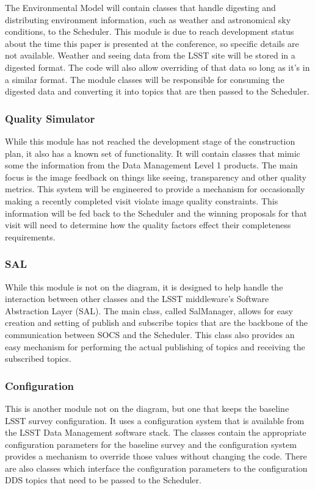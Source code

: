 \documentclass[]{spie}  %
\begin{document}
The Environmental Model will contain classes that handle digesting and distributing environment information, such as weather and astronomical sky conditions, to the Scheduler. This module is due to reach development status about the time this paper is presented at the conference, so specific details are not available. Weather and seeing data from the LSST site will be stored in a digested format. The code will also allow overriding of that data so long as it's in a similar format. The module classes will be responsible for consuming the digested data and converting it into topics that are then passed to the Scheduler.

\subsubsection{Quality Simulator}

While this module has not reached the development stage of the construction plan, it also has a known set of functionality. It will contain classes that mimic some the information from the Data Management Level 1 products\cite{DPDD}. The main focus is the image feedback on things like seeing, transparency and other quality metrics. This system will be engineered to provide a mechanism for occasionally making a recently completed visit violate image quality constraints. This information will be fed back to the Scheduler and the winning proposals for that visit will need to determine how the quality factors effect their completeness requirements.

\subsubsection{SAL}

While this module is not on the diagram, it is designed to help handle the interaction between other classes and the LSST middleware's Software Abstraction Layer (SAL). The main class, called SalManager, allows for easy creation and setting of publish and subscribe topics that are the backbone of the communication between SOCS and the Scheduler. This class also provides an easy mechanism for performing the actual publishing of topics and receiving the subscribed topics.

\subsubsection{Configuration}

This is another module not on the diagram, but one that keeps the baseline LSST survey configuration. It uses a configuration system that is available from the LSST Data Management software stack\cite{2016_adassxxv_O3-1}. The classes contain the appropriate configuration parameters for the baseline survey and the configuration system provides a mechanism to override those values without changing the code. There are also classes which interface the configuration parameters to the configuration DDS topics that need to be passed to the Scheduler.
\end{document}
